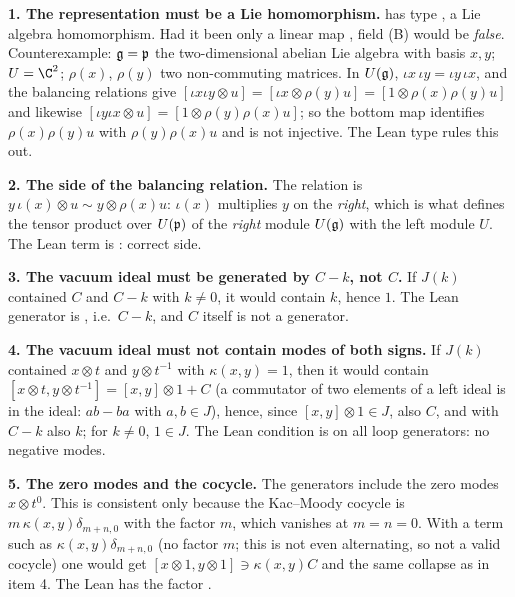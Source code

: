 \begin{warning}
\textbf{1. The representation must be a Lie homomorphism.}  has type
, a Lie algebra homomorphism. Had it been only a linear map
, field (B) would be \emph{false}. Counterexample: $\mathfrak{g} = \mathfrak{p}$ the
two-dimensional abelian Lie algebra with basis $x,y$; $U = \C^2$; $\rho(x)$, $\rho(y)$ two
non-commuting matrices. In $U(\mathfrak{g})$, $\iota x\,\iota y = \iota y\,\iota x$, and the balancing relations
give $[\iota x\iota y\otimes u] = [\iota x\otimes\rho(y)u] = [1\otimes\rho(x)\rho(y)u]$ and likewise
$[\iota y\iota x\otimes u] = [1\otimes\rho(y)\rho(x)u]$; so the bottom map identifies $\rho(x)\rho(y)u$ with
$\rho(y)\rho(x)u$ and is not injective. The Lean type rules this out.

\textbf{2. The side of the balancing relation.} The relation is $y\,\iota(x)\otimes u\sim y\otimes\rho(x)u$:
$\iota(x)$ multiplies $y$ on the \emph{right}, which is what defines the tensor product over $U(\mathfrak{p})$
of the \emph{right} module $U(\mathfrak{g})$ with the left module $U$. The Lean term is
: correct side.

\textbf{3. The vacuum ideal must be generated by $C-k$, not $C$.} If $J(k)$ contained $C$ and $C-k$
with $k\ne0$, it would contain $k$, hence $1$. The Lean generator is
, i.e.\ $C-k$, and $C$ itself is not a generator.

\textbf{4. The vacuum ideal must not contain modes of both signs.} If $J(k)$ contained $x\otimes t$ and
$y\otimes t^{-1}$ with $\kappa(x,y) = 1$, then it would contain
$[x\otimes t, y\otimes t^{-1}] = [x,y]\otimes1 + C$ (a commutator of two elements of a left ideal is in the
ideal: $ab - ba$ with $a,b\in J$), hence, since $[x,y]\otimes 1\in J$, also $C$, and with $C-k$ also $k$;
for $k\ne0$, $1\in J$. The Lean condition is  on all loop generators: no negative modes.

\textbf{5. The zero modes and the cocycle.} The generators include the zero modes $x\otimes t^0$. This
is consistent only because the Kac--Moody cocycle is $m\,\kappa(x,y)\delta_{m+n,0}$ with the factor $m$,
which vanishes at $m=n=0$. With a term such as $\kappa(x,y)\delta_{m+n,0}$ (no factor $m$; this is
not even alternating, so not a valid cocycle) one would get $[x\otimes1,y\otimes1]\ni\kappa(x,y)C$ and the same collapse as in item 4.
The Lean  has the factor .


\end{warning}
